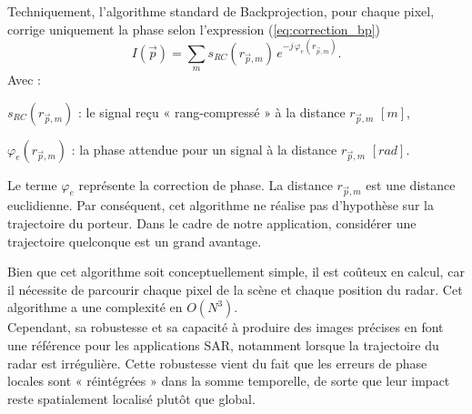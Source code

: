 Techniquement, l'algorithme standard de Backprojection, pour chaque pixel, corrige uniquement la phase selon l'expression (\ref{eq:correction_bp})
\begin{equation}
    \label{eq:correction_bp}
    I(\vec{p})=\sum_m s_{RC}(r_{\vec{p}, m}) \, e^{-j \, \varphi_{e}(r_{\vec{p}, m})}. 
\end{equation}
Avec :
\begin{description}
    \item $s_{RC}(r_{\vec{p}, m})$ : le signal reçu « rang-compressé » à la distance $r_{\vec{p}, m}$ $[m]$,
    \item $\varphi_e(r_{\vec{p}, m})$ : la phase attendue pour un signal à la distance $r_{\vec{p}, m}$ $[rad]$.
\end{description}
\vspace{1em}
Le terme $\varphi_e$ représente la correction de phase.
La distance $r_{\vec{p}, m}$ est une distance euclidienne. Par conséquent, cet algorithme ne réalise pas d'hypothèse sur la trajectoire du porteur. Dans le cadre de notre application, considérer une trajectoire quelconque est un grand avantage.

Bien que cet algorithme soit conceptuellement simple, il est coûteux en calcul, car il nécessite de parcourir chaque pixel de la scène et chaque position du radar. Cet algorithme a une complexité en $O(N^3)$. \\
Cependant, sa robustesse et sa capacité à produire des images précises en font une référence pour les applications SAR, notamment lorsque la trajectoire du radar est irrégulière. Cette robustesse vient du fait que les erreurs de phase locales sont « réintégrées » dans la somme temporelle, de sorte que leur impact reste spatialement localisé plutôt que global.
